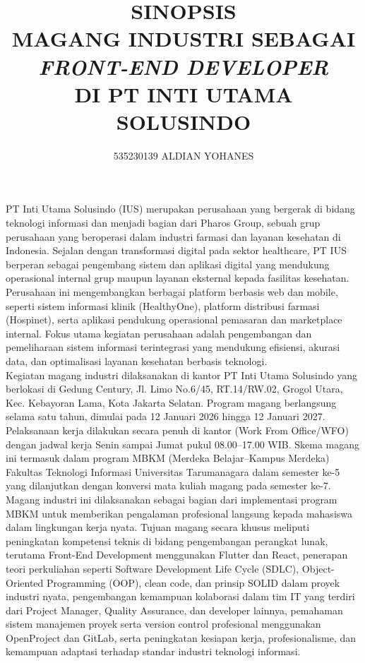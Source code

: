 \documentclass[12pt, a4paper]{article}
\title{
    SINOPSIS\\
    MAGANG INDUSTRI SEBAGAI \textit{FRONT-END DEVELOPER}\\
    DI PT INTI UTAMA SOLUSINDO
}
\author{535230139 ALDIAN YOHANES}
\begin{document}
\makeatletter
\begin{center}
    \large\textbf{\@title}
\end{center}

\makeatother
PT Inti Utama Solusindo (IUS) merupakan perusahaan yang bergerak di bidang teknologi informasi dan menjadi bagian dari Pharos Group, sebuah grup perusahaan yang beroperasi dalam industri farmasi dan layanan kesehatan di Indonesia. Sejalan dengan transformasi digital pada sektor healthcare, PT IUS berperan sebagai pengembang sistem dan aplikasi digital yang mendukung operasional internal grup maupun layanan eksternal kepada fasilitas kesehatan.\\
Perusahaan ini mengembangkan berbagai platform berbasis web dan mobile, seperti sistem informasi klinik (HealthyOne), platform distribusi farmasi (Hospinet), serta aplikasi pendukung operasional pemasaran dan marketplace internal. Fokus utama kegiatan perusahaan adalah pengembangan dan pemeliharaan sistem informasi terintegrasi yang mendukung efisiensi, akurasi data, dan optimalisasi layanan kesehatan berbasis teknologi.\\
Kegiatan magang industri dilaksanakan di kantor PT Inti Utama Solusindo yang berlokasi di Gedung Century, Jl. Limo No.6/45, RT.14/RW.02, Grogol Utara, Kec. Kebayoran Lama, Kota Jakarta Selatan. Program magang berlangsung selama satu tahun, dimulai pada 12 Januari 2026 hingga 12 Januari 2027.\\
Pelaksanaan kerja dilakukan secara penuh di kantor (Work From Office/WFO) dengan jadwal kerja Senin sampai Jumat pukul 08.00–17.00 WIB. Skema magang ini termasuk dalam program MBKM (Merdeka Belajar–Kampus Merdeka) Fakultas Teknologi Informasi Universitas Tarumanagara dalam semester ke-5 yang dilanjutkan dengan konversi mata kuliah magang pada semester ke-7.\\
Magang industri ini dilaksanakan sebagai bagian dari implementasi program MBKM untuk memberikan pengalaman profesional langsung kepada mahasiswa dalam lingkungan kerja nyata. Tujuan magang secara khusus meliputi peningkatan kompetensi teknis di bidang pengembangan perangkat lunak, terutama Front-End Development menggunakan Flutter dan React, penerapan teori perkuliahan seperti Software Development Life Cycle (SDLC), Object-Oriented Programming (OOP), clean code, dan prinsip SOLID dalam proyek industri nyata, pengembangan kemampuan kolaborasi dalam tim IT yang terdiri dari Project Manager, Quality Assurance, dan developer lainnya, pemahaman sistem manajemen proyek serta version control profesional menggunakan OpenProject dan GitLab, serta peningkatan kesiapan kerja, profesionalisme, dan kemampuan adaptasi terhadap standar industri teknologi informasi.\\
\end{document}
